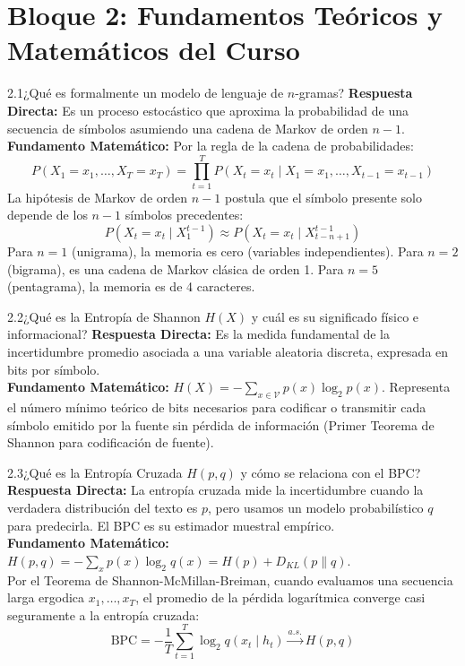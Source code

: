 \documentclass[11pt,letterpaper]{article}
\begin{document}
\section{Bloque 2: Fundamentos Teóricos y Matemáticos del Curso}

\begin{qbox}{2.1}{¿Qué es formalmente un modelo de lenguaje de $n$-gramas?}
\textbf{Respuesta Directa:} Es un proceso estocástico que aproxima la probabilidad de una secuencia de símbolos asumiendo una cadena de Markov de orden $n-1$.\\[3pt]
\textbf{Fundamento Matemático:} Por la regla de la cadena de probabilidades:
$$P(X_1=x_1, \ldots, X_T=x_T) = \prod_{t=1}^T P(X_t=x_t \mid X_1=x_1, \ldots, X_{t-1}=x_{t-1})$$
La hipótesis de Markov de orden $n-1$ postula que el símbolo presente solo depende de los $n-1$ símbolos precedentes:
$$P(X_t=x_t \mid X_1^{t-1}) \approx P(X_t=x_t \mid X_{t-n+1}^{t-1})$$
Para $n=1$ (unigrama), la memoria es cero (variables independientes). Para $n=2$ (bigrama), es una cadena de Markov clásica de orden 1. Para $n=5$ (pentagrama), la memoria es de 4 caracteres.
\end{qbox}

\begin{qbox}{2.2}{¿Qué es la Entropía de Shannon $H(X)$ y cuál es su significado físico e informacional?}
\textbf{Respuesta Directa:} Es la medida fundamental de la incertidumbre promedio asociada a una variable aleatoria discreta, expresada en bits por símbolo.\\[3pt]
\textbf{Fundamento Matemático:} $H(X) = -\sum_{x \in \mathcal{V}} p(x) \log_2 p(x)$. Representa el número mínimo teórico de bits necesarios para codificar o transmitir cada símbolo emitido por la fuente sin pérdida de información (Primer Teorema de Shannon para codificación de fuente).
\end{qbox}

\begin{qbox}{2.3}{¿Qué es la Entropía Cruzada $H(p,q)$ y cómo se relaciona con el BPC?}
\textbf{Respuesta Directa:} La entropía cruzada mide la incertidumbre cuando la verdadera distribución del texto es $p$, pero usamos un modelo probabilístico $q$ para predecirla. El BPC es su estimador muestral empírico.\\[3pt]
\textbf{Fundamento Matemático:} $H(p,q) = -\sum_{x} p(x) \log_2 q(x) = H(p) + D_{KL}(p \parallel q)$.\\
Por el Teorema de Shannon-McMillan-Breiman, cuando evaluamos una secuencia larga ergodica $x_1, \ldots, x_T$, el promedio de la pérdida logarítmica converge casi seguramente a la entropía cruzada:
$$\text{BPC} = -\frac{1}{T} \sum_{t=1}^T \log_2 q(x_t \mid h_t) \xrightarrow{a.s.} H(p,q)$$
\end{qbox}
\end{document}

